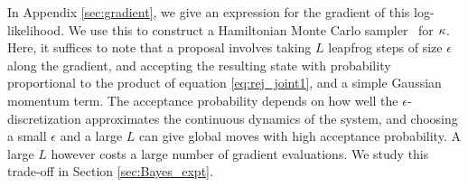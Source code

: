 In Appendix \ref{sec:gradient}, we give an expression for the gradient of this log-likelihood. %
%
We use this to construct a Hamiltonian Monte Carlo sampler~\citep{Neal2010} for $\kappa$. %
Here, it suffices to note that a proposal involves taking $L$ 
leapfrog steps of size $\epsilon$ along the gradient, and accepting the resulting state with probability proportional to the product of equation
\eqref{eq:rej_joint1}, and a simple Gaussian momentum term. The acceptance probability depends on how well the
$\epsilon$-discretization approximates the continuous dynamics of the system, and choosing a small $\epsilon$ and a large $L$ can give global moves with high
acceptance probability. A large $L$ however costs a large number of gradient evaluations. We study this trade-off
in Section \ref{sec:Bayes_expt}. %

